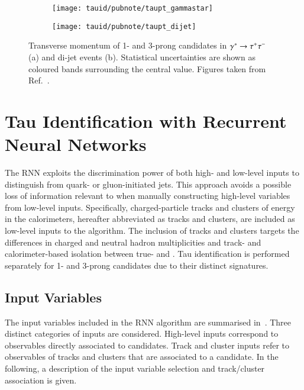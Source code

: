 \begin{figure}[htbp]
  \begin{subfigure}{0.498\textwidth}
    \texttt{[image: tauid/pubnote/taupt\_gammastar]}
    \label{fig:tauid_candidate_pt_gammastar}
  \end{subfigure}\hfill%
  \begin{subfigure}{0.498\textwidth}
    \texttt{[image: tauid/pubnote/taupt\_dijet]}
    \label{fig:tauid_candidate_pt_dijet}
  \end{subfigure}

  \caption{Transverse momentum of 1- and 3-prong \tauhadvis candidates
    in $\gamma^{*} \to \tau^{+} \tau^{-}$ (a) and di-jet events (b). Statistical
    uncertainties are shown as coloured bands surrounding the central
    value. Figures taken from Ref.~\cite{ATL-PHYS-PUB-2019-033}.}%
  \label{fig:tauid_candidate_pt}
\end{figure}


\section{Tau Identification with Recurrent Neural Networks}%
\label{sec:tauid_rnn}

The RNN \tauid exploits the discrimination power of both high- and
low-level inputs to distinguish \tauhad from quark- or gluon-initiated
jets. This approach avoids a possible loss of information relevant to
\tauid when manually constructing high-level variables from low-level
inputs. Specifically, charged-particle tracks and clusters of energy
in the calorimeters, hereafter abbreviated as tracks and clusters, are
included as low-level inputs to the algorithm. The inclusion of tracks
and clusters targets the differences in charged and neutral hadron
multiplicities and track- and calorimeter-based isolation between
true- and \faketauhadvis. Tau identification is performed separately
for 1- and 3-prong \tauhadvis candidates due to their distinct
signatures.


\subsection{Input Variables}

The input variables included in the RNN \tauid algorithm are
summarised in~. Three distinct
categories of inputs are considered. High-level inputs correspond to
observables directly associated to \tauhadvis candidates. Track and
cluster inputs refer to observables of tracks and clusters that are
associated to a \tauhadvis candidate. In the following, a description
of the input variable selection and track/cluster association is
given.

